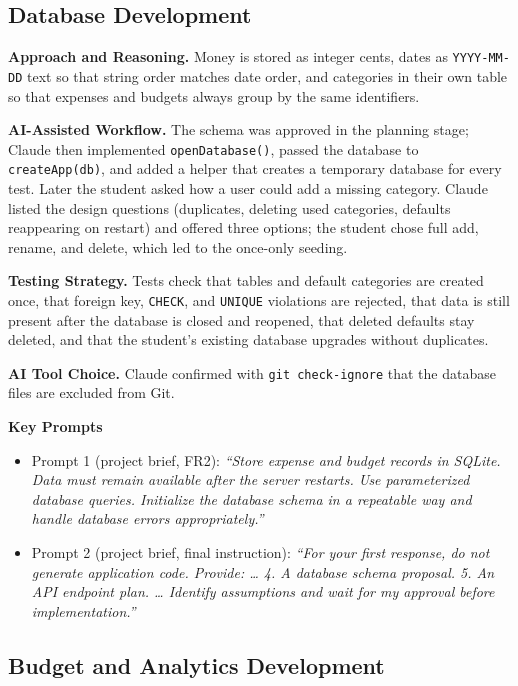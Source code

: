 \documentclass[11pt,a4paper]{article}
\newcommand{\prompt}[1]{\textit{``#1''}}
\begin{document}
\subsection{Database Development}

\textbf{Approach and Reasoning.} Money is stored as integer cents, dates
as \texttt{YYYY-MM-DD} text so that string order matches date order, and
categories in their own table so that expenses and budgets always group
by the same identifiers.

\textbf{AI-Assisted Workflow.} The schema was approved in the planning
stage; Claude then implemented \texttt{openDatabase()}, passed the
database to \texttt{createApp(db)}, and added a helper that creates a
temporary database for every test. Later the student asked how a user
could add a missing category. Claude listed the design questions
(duplicates, deleting used categories, defaults reappearing on restart)
and offered three options; the student chose full add, rename, and
delete, which led to the once-only seeding.

\textbf{Testing Strategy.} Tests check that tables and default
categories are created once, that foreign key, \texttt{CHECK}, and
\texttt{UNIQUE} violations are rejected, that data is still present after
the database is closed and reopened, that deleted defaults stay deleted,
and that the student's existing database upgrades without duplicates.

\textbf{AI Tool Choice.} Claude confirmed with \texttt{git check-ignore}
that the database files are excluded from Git.

\textbf{Key Prompts}
\begin{itemize}
    \item Prompt 1 (project brief, FR2): \prompt{Store expense and budget records in SQLite. Data must remain available after the server restarts. Use parameterized database queries. Initialize the database schema in a repeatable way and handle database errors appropriately.}
    \item Prompt 2 (project brief, final instruction): \prompt{For your first response, do not generate application code. Provide: \ldots{} 4. A database schema proposal. 5. An API endpoint plan. \ldots{} Identify assumptions and wait for my approval before implementation.}
\end{itemize}

\subsection{Budget and Analytics Development}
\end{document}
